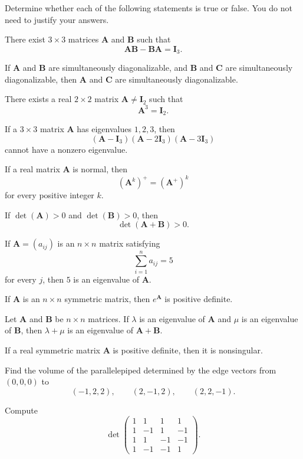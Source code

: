 \begin{problem}
Determine whether each of the following statements is true or false. You do not need to justify your answers.
\begin{problemchoices}
\item There exist $3\times3$ matrices $\mathbf A$ and $\mathbf B$ such that
\[
\mathbf A\mathbf B-\mathbf B\mathbf A=\mathbf I_3.
\]
\item If $\mathbf A$ and $\mathbf B$ are simultaneously diagonalizable, and $\mathbf B$ and $\mathbf C$ are simultaneously diagonalizable, then $\mathbf A$ and $\mathbf C$ are simultaneously diagonalizable.
\item There exists a real $2\times2$ matrix $\mathbf A\ne\mathbf I_2$ such that
\[
\mathbf A^3=\mathbf I_2.
\]
\item If a $3\times3$ matrix $\mathbf A$ has eigenvalues $1,2,3$, then
\[
(\mathbf A-\mathbf I_3)(\mathbf A-2\mathbf I_3)(\mathbf A-3\mathbf I_3)
\]
cannot have a nonzero eigenvalue.
\item If a real matrix $\mathbf A$ is normal, then
\[
(\mathbf A^k)^+=(\mathbf A^+)^k
\]
for every positive integer $k$.
\item If $\det(\mathbf A)>0$ and $\det(\mathbf B)>0$, then
\[
\det(\mathbf A+\mathbf B)>0.
\]
\item If $\mathbf A=(a_{ij})$ is an $n\times n$ matrix satisfying
\[
\sum_{i=1}^n a_{ij}=5
\]
for every $j$, then $5$ is an eigenvalue of $\mathbf A$.
\item If $\mathbf A$ is an $n\times n$ symmetric matrix, then $e^{\mathbf A}$ is positive definite.
\item Let $\mathbf A$ and $\mathbf B$ be $n\times n$ matrices. If $\lambda$ is an eigenvalue of $\mathbf A$ and $\mu$ is an eigenvalue of $\mathbf B$, then $\lambda+\mu$ is an eigenvalue of $\mathbf A+\mathbf B$.
\item If a real symmetric matrix $\mathbf A$ is positive definite, then it is nonsingular.
\end{problemchoices}
\end{problem}

\begin{problem}
\begin{problemsubparts}
\item Find the volume of the parallelepiped determined by the edge vectors from $(0,0,0)$ to
\[
(-1,2,2),\qquad (2,-1,2),\qquad (2,2,-1).
\]
\item Compute
\[
\det
\begin{pmatrix}
1&1&1&1\\
1&-1&1&-1\\
1&1&-1&-1\\
1&-1&-1&1
\end{pmatrix}.
\]
\end{problemsubparts}
\end{problem}

